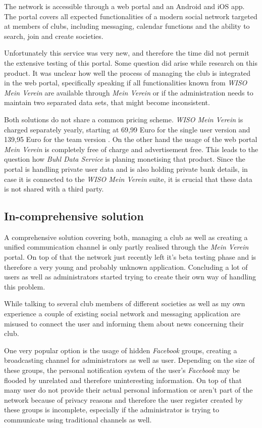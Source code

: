 The network is accessible through a web portal and an Android and iOS app. The portal covers all expected functionalities of a modern social network targeted at members of clubs, including messaging, calendar functions and the ability to search, join and create societies. 

Unfortunately this service was very new, and therefore the time did not permit the extensive testing of this portal. Some question did arise while research on this product. It was unclear how well the process of managing the club is integrated in the web portal, specifically speaking if all functionalities known from \emph{WISO Mein Verein} are available through \emph{Mein Verein} or if the administration needs to maintain two separated data sets, that might become inconsistent. 

Both solutions do not share a common pricing scheme. \emph{WISO Mein Verein} is charged separately yearly, starting at 69,99 Euro for the single user version and 139,95 Euro for the team version \cite{Buhl:2015ab}. On the other hand the usage of the web portal \emph{Mein Verein} is completely free of charge and advertisement free. This leads to the question how \emph{Buhl Data Service} is planing monetising that product. Since the portal is handling private user data and is also holding private bank details, in case it is connected to the \emph{WISO Mein Verein} suite, it is crucial that these data is not shared with a third party.

\subsection{In-comprehensive solution}

A comprehensive solution covering both, managing a club as well as creating a unified communication channel is only partly realised through the \emph{Mein Verein} portal. On top of that the network just recently left it's beta testing phase and is therefore a very young and probably unknown application. Concluding a lot of users as well as administrators started trying to create their own way of handling this problem. 

While talking to several club members of different societies as well as my own experience a couple of existing social network and messaging application are misused to connect the user and informing them about news concerning their club. 

One very popular option is the usage of hidden \emph{Facebook} groups, creating a broadcasting channel for administrators as well as user. Depending on the size of these groups, the personal notification system of the user's \emph{Facebook} may be flooded by unrelated and therefore uninteresting information. On top of that many user do not provide their actual personal information or aren't part of the network because of privacy reasons and therefore the user register created by these groups is incomplete, especially if the administrator is trying to communicate using traditional channels as well. 

